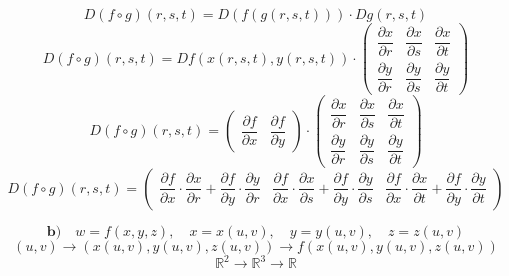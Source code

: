\documentclass[11pt]{article}
\begin{document}
\[
D(f \circ g)(r, s, t) = D(f(g(r, s, t))) \cdot Dg(r, s, t)
\]
\[
D(f \circ g)(r, s, t) = Df(x(r, s, t), y(r, s, t)) \cdot \begin{pmatrix}
    \dfrac{\partial x}{\partial r} & \dfrac{\partial x}{\partial s} & \dfrac{\partial x}{\partial t} \\
    \dfrac{\partial y}{\partial r} & \dfrac{\partial y}{\partial s} & \dfrac{\partial y}{\partial t}
\end{pmatrix}
\]
\[
D(f \circ g)(r, s, t) = \begin{pmatrix}
    \dfrac{\partial f}{\partial x} & \dfrac{\partial f}{\partial y}
\end{pmatrix} \cdot \begin{pmatrix}
    \dfrac{\partial x}{\partial r} & \dfrac{\partial x}{\partial s} & \dfrac{\partial x}{\partial t} \\
    \dfrac{\partial y}{\partial r} & \dfrac{\partial y}{\partial s} & \dfrac{\partial y}{\partial t}
\end{pmatrix}
\]
\[
D(f \circ g)(r, s, t) = \begin{pmatrix}
    \dfrac{\partial f}{\partial x} \cdot \dfrac{\partial x}{\partial r} + \dfrac{\partial f}{\partial y} \cdot \dfrac{\partial y}{\partial r} & \dfrac{\partial f}{\partial x} \cdot \dfrac{\partial x}{\partial s} + \dfrac{\partial f}{\partial y} \cdot \dfrac{\partial y}{\partial s} & \dfrac{\partial f}{\partial x} \cdot \dfrac{\partial x}{\partial t} + \dfrac{\partial f}{\partial y} \cdot \dfrac{\partial y}{\partial t}
\end{pmatrix}
\]

\[ \mathbf{b)} \quad w = f(x, y, z), \quad x = x(u, v), \quad y = y(u, v), \quad z = z(u, v) \]
\[ (u, v) \rightarrow (x(u, v), y(u, v), z(u, v)) \rightarrow f(x(u, v), y(u, v), z(u, v)) \]
\[ \mathbb{R}^2 \rightarrow \mathbb{R}^3 \rightarrow \mathbb{R} \]
\end{document}
